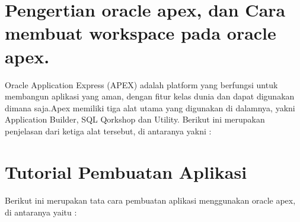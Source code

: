 \clearpage
\setcounter{page}{1}
\section{Pengertian oracle apex, dan Cara membuat workspace pada oracle apex.}

Oracle Application Express (APEX) adalah platform yang berfungsi untuk membangun aplikasi yang aman, dengan fitur kelas dunia dan dapat digunakan dimana saja.Apex memiliki tiga alat utama yang digunakan di dalamnya, yakni Application Builder, SQL Qorkshop dan Utility. Berikut ini merupakan penjelasan dari ketiga alat tersebut, di antaranya yakni :
\section{Tutorial Pembuatan Aplikasi}
\paragraph{}
Berikut ini merupakan tata cara pembuatan aplikasi menggunakan oracle apex, di antaranya yaitu :\\
